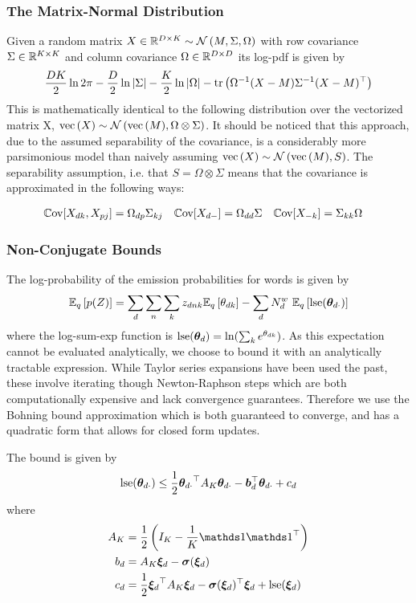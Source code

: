\subsubsection*{The Matrix-Normal Distribution}
Given a random matrix $X \in \MReal{D}{K} \sim \mnor{M}{\Sigma}{\Omega}$ with row covariance $\Sigma \in \MReal{K}{K}$ and column covariance $\Omega \in \MReal{D}{D}$ its log-pdf is given by
\begin{align}
\halve{DK}\ln 2\pi - \halve{D}\ln|\Sigma| - \halve{K} \ln|\Omega| -\Tr{\inv{\Omega}(X - M)\inv{\Sigma}(X - M)\T}
\end{align}
This is mathematically identical to the following distribution over the vectorized matrix X, $\vecf{X} \sim \nor{\vecf{M}}{\Omega \otimes \Sigma}$. It should be noticed that this approach, due to the assumed separability of the covariance, is a considerably more parsimonious model than naively assuming $\vecf{X} \sim \nor{\vecf{M}}{S}$. The separability assumption, i.e. that $S = \Omega \otimes \Sigma$ means that the covariance is approximated in the following ways:

\begin{align}
\cov{X_{dk}, X_{pj}} & = \Omega_{dp} \Sigma_{kj} &
\cov{X_{d-}} & = \Omega_{dd} \Sigma &
\cov{X_{-k}} & = \Sigma_{kk} \Omega \label{eqn:sep-cov-forms}
\end{align}

\subsubsection*{Non-Conjugate Bounds}
The log-probability of the emission probabilities for words is given by
\begin{align}
\ex{p(Z)}{q} = \sum_d \sum_n \sum_k \zdnk \ex{\thdk}{q} - \sum_d N^w_d \text{ }\ex{\lse(\thdo)}{q}
\end{align}
where the log-sum-exp function is $\lse(\thd) = \ln (\sum_k e^\thdk)$. As this expectation cannot be evaluated analytically, we choose to bound it with an analytically tractable expression. While Taylor series expansions have been used the past\cite{Blei2006}\cite{Wang2013a}, these involve iterating though Newton-Raphson steps which are both computationally expensive and lack convergence guarantees. Therefore we use the Bohning bound approximation\cite{Bohning1988} which is both guaranteed to converge, and has a quadratic form that allows for closed form updates.

The bound is given by
\begin{align}
\lse(\thdo) \leq \half \thdo\T A_K \thdo - \vv{b}_d\T\thdo + c_d \label{eqn:lse-def}
\end{align}
where
\begin{align}
A_K & = \half \left( I_K - \frac{1}{K} \one \one\T \right) \\
b_d & = A_K \Ed - \vv{\sigma}(\Ed) \label{eqn:bohning-b} \\
c_d & = \frac{1}{2} \Ed\T A_K \Ed - \vv{\sigma}(\Ed)\T\Ed + \lse(\Ed) \label{eqn:bohning-c}
\end{align}

